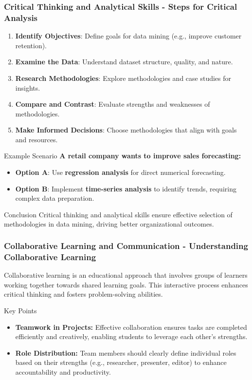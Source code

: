 \documentclass{beamer}
\begin{document}
\begin{frame}[fragile]
    \frametitle{Critical Thinking and Analytical Skills - Steps for Critical Analysis}
    
    \begin{enumerate}
        \item \textbf{Identify Objectives}: Define goals for data mining (e.g., improve customer retention).
        \item \textbf{Examine the Data}: Understand dataset structure, quality, and nature.
        \item \textbf{Research Methodologies}: Explore methodologies and case studies for insights.
        \item \textbf{Compare and Contrast}: Evaluate strengths and weaknesses of methodologies.
        \item \textbf{Make Informed Decisions}: Choose methodologies that align with goals and resources.
    \end{enumerate}

    \begin{block}{Example Scenario}
        \textbf{A retail company wants to improve sales forecasting:}
        \begin{itemize}
            \item \textbf{Option A}: Use \textbf{regression analysis} for direct numerical forecasting.
            \item \textbf{Option B}: Implement \textbf{time-series analysis} to identify trends, requiring complex data preparation.
        \end{itemize}
    \end{block}
    
    \begin{block}{Conclusion}
        Critical thinking and analytical skills ensure effective selection of methodologies in data mining, driving better organizational outcomes.
    \end{block}
\end{frame}

\begin{frame}[fragile]
    \frametitle{Collaborative Learning and Communication - Understanding Collaborative Learning}
    Collaborative learning is an educational approach that involves groups of learners working together towards shared learning goals. This interactive process enhances critical thinking and fosters problem-solving abilities.
    
    \begin{block}{Key Points}
        \begin{itemize}
            \item \textbf{Teamwork in Projects:} Effective collaboration ensures tasks are completed efficiently and creatively, enabling students to leverage each other's strengths.
            \item \textbf{Role Distribution:} Team members should clearly define individual roles based on their strengths (e.g., researcher, presenter, editor) to enhance accountability and productivity.
        \end{itemize}
    \end{block}
\end{frame}
\end{document}
